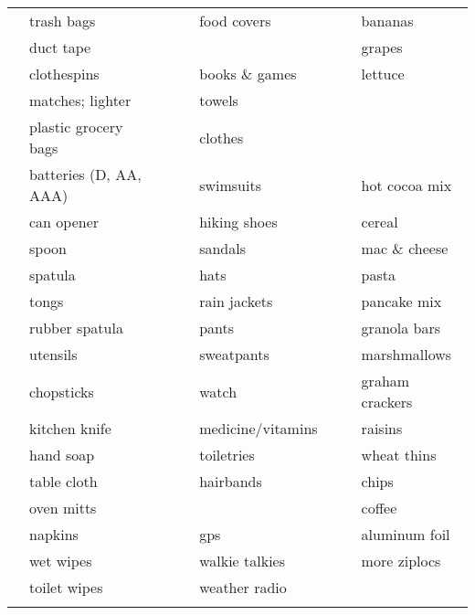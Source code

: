 \documentclass[10pt]{article}
\newcommand{\mybox}{\framebox[4mm]{\textcolor{white} m} \framebox[4mm]{\textcolor{white} m} }
\begin{document}
\begin{tabular}{rlcrlcrl}
\mybox & trash bags             &    &\mybox & food covers          &    &\mybox & bananas \\
\mybox & duct tape              &    &\mybox &                      &    &\mybox & grapes \\ \cline{4-5}
\mybox & clothespins            &    &\mybox & books \& games       &    &\mybox & lettuce \\
\mybox & matches; lighter       &    &\mybox & towels               &    &\mybox & \\
\mybox & plastic grocery bags   &    &\mybox & clothes              &    &\mybox & \\ \cline{7-8}
\mybox & batteries (D, AA, AAA) &    &\mybox & swimsuits            &    &\mybox & hot cocoa mix \\ \cline{1-2}
\mybox & can opener             &    &\mybox & hiking shoes         &    &\mybox & cereal \\
\mybox & spoon                  &    &\mybox & sandals              &    &\mybox & mac \& cheese \\
\mybox & spatula                &    &\mybox & hats                 &    &\mybox & pasta \\
\mybox & tongs                  &    &\mybox & rain jackets         &    &\mybox & pancake mix \\
\mybox & rubber spatula         &    &\mybox & pants                &    &\mybox & granola bars \\
\mybox & utensils               &    &\mybox & sweatpants           &    &\mybox & marshmallows \\
\mybox & chopsticks             &    &\mybox & watch                &    &\mybox & graham crackers \\
\mybox & kitchen knife          &    &\mybox & medicine/vitamins    &    &\mybox & raisins \\
\mybox & hand soap              &    &\mybox & toiletries           &    &\mybox & wheat thins \\
\mybox & table cloth            &    &\mybox & hairbands            &    &\mybox & chips \\ 
\mybox & oven mitts             &    &\mybox &                      &    &\mybox & coffee \\ \cline{4-5}
\mybox & napkins                &    &\mybox & gps                  &    &\mybox & aluminum foil \\
\mybox & wet wipes              &    &\mybox & walkie talkies       &    &\mybox & more ziplocs \\
\mybox & toilet wipes           &    &\mybox & weather radio        &    &\mybox & \\
\mybox & \hspace{1.5in}         &    &\mybox & \hspace{1.5in}       &    &\mybox & \hspace{1.5in} \\ \hline
\end{tabular}
\end{document}
